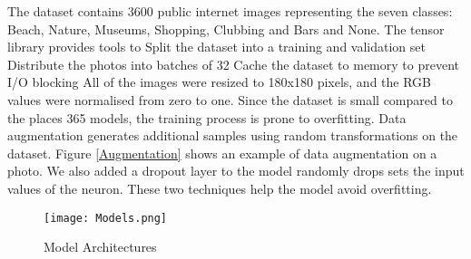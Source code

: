 The dataset contains 3600 public internet images
representing the seven classes: Beach, Nature,
Museums, Shopping, Clubbing and Bars and None. The
tensor library provides tools to Split the dataset
into a training and validation set Distribute the
photos into batches of 32 Cache the dataset to memory
to prevent I/O blocking All of the images were resized
to 180x180 pixels, and the RGB values were normalised
from zero to one.  	Since the dataset is small
compared to the places 365 models, the training
process is prone to overfitting. Data augmentation
generates additional samples using random
transformations on the dataset. Figure \ref{Augmentation} shows an
example of data augmentation on a photo. We also added
a dropout layer to the model randomly drops sets the
input values of the neuron. These two techniques help
the model avoid overfitting.

\begin{figure}[h]
\centering
\texttt{[image: Models.png]}
\caption{Model Architectures}
\label{Models}
\end{figure}


